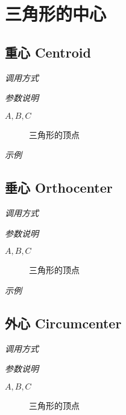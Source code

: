 \chapter{三角形的中心}

\section{重心 Centroid}

\emph{调用方式}

\begin{tcolorbox}{}
\end{tcolorbox}

\emph{参数说明}

\begin{description}
  \item[$A,B,C$] 三角形的顶点
\end{description}

\emph{示例}


\section{垂心 Orthocenter}

\emph{调用方式}

\begin{tcolorbox}{}
\end{tcolorbox}

\emph{参数说明}

\begin{description}
  \item[$A,B,C$] 三角形的顶点
\end{description}

\emph{示例}


\section{外心 Circumcenter}

\emph{调用方式}

\begin{tcolorbox}{}
\end{tcolorbox}

\emph{参数说明}

\begin{description}
  \item[$A,B,C$] 三角形的顶点
\end{description}

